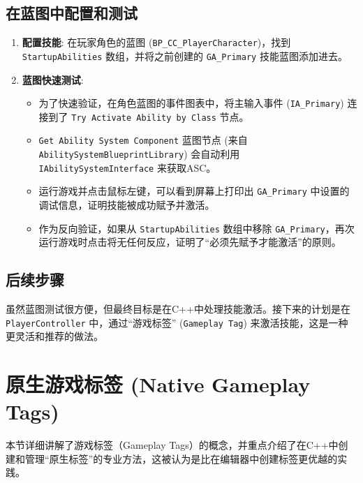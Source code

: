 \documentclass[10pt,CJKmath]{zhbook-v1}
\begin{document}
\subsection{在蓝图中配置和测试}
\begin{enumerate}
    \item \textbf{配置技能}: 在玩家角色的蓝图 (\texttt{BP\_CC\_PlayerCharacter})，找到 \texttt{StartupAbilities} 数组，并将之前创建的 \texttt{GA\_Primary} 技能蓝图添加进去。
    \item \textbf{蓝图快速测试}:
    \begin{itemize}
        \item 为了快速验证，在角色蓝图的事件图表中，将主输入事件 (\texttt{IA\_Primary}) 连接到了 \texttt{Try Activate Ability by Class} 节点。
        \item \texttt{Get Ability System Component} 蓝图节点 (来自 \texttt{AbilitySystemBlueprintLibrary}) 会自动利用 \texttt{IAbilitySystemInterface} 来获取ASC。
        \item 运行游戏并点击鼠标左键，可以看到屏幕上打印出 \texttt{GA\_Primary} 中设置的调试信息，证明技能被成功赋予并激活。
        \item 作为反向验证，如果从 \texttt{StartupAbilities} 数组中移除 \texttt{GA\_Primary}，再次运行游戏时点击将无任何反应，证明了“必须先赋予才能激活”的原则。
    \end{itemize}
\end{enumerate}

\subsection{后续步骤}
虽然蓝图测试很方便，但最终目标是在C++中处理技能激活。接下来的计划是在\texttt{PlayerController} 中，通过“游戏标签” (\texttt{Gameplay Tag}) 来激活技能，这是一种更灵活和推荐的做法。


\section{原生游戏标签 (Native Gameplay Tags)}
本节详细讲解了游戏标签（Gameplay Tags）的概念，并重点介绍了在C++中创建和管理“原生标签”的专业方法，这被认为是比在编辑器中创建标签更优越的实践。
\end{document}
